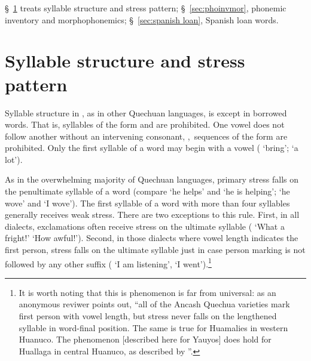 {§~\ref{sec:syllabe structure} treats syllable structure and stress pattern; §~\ref{sec:phoinvmor}, phonemic inventory and morphophonemics; §~\ref{sec:spanish loan}, Spanish loan words. 

\section{Syllable structure and stress pattern}\label{sec:syllabe structure}
Syllable structure in \SYQ, as in other Quechuan languages, is \pCpVpCp{} except in borrowed words. That is, syllables of the form \CCV{} and \VCC{} are prohibited. One vowel does not follow another without an intervening consonant, \ie,~sequences of the form \VV{} are prohibited. Only the first syllable of a word may begin with a vowel ( ‘bring’;  ‘a lot’). 

As in the overwhelming majority of Quechuan languages, primary stress falls on the penultimate syllable of a word (compare  ‘he helps’ and  ‘he is helping’;  ‘he wove’ and  ‘I wove’). The first syllable of a word with more than four syllables generally receives weak stress. There are two exceptions to this rule. First, in all dialects, exclamations often receive stress on the ultimate syllable ( ‘What a fright!’  ‘How awful!’). Second, in those dialects where vowel length indicates the first person, stress falls on the ultimate syllable just in case person marking is not followed by any other suffix ( ‘I am listening’,  ‘I went’).\footnote{It is worth noting that this is phenomenon is far from universal: as an anonymous reviwer points out, “all of the Ancash Quechua varieties mark first person with vowel length, but stress never falls on the lengthened syllable in word-final position. The same is true for Huamalies in western Huanuco. The phenomenon [described here for Yauyos] does hold for Huallaga in central Huanuco, as described by \citet{Weber89}”.}

}
